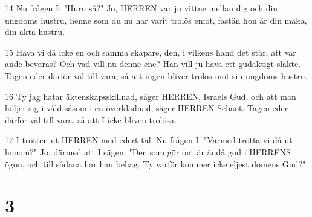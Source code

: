 \par 14 Nu frågen I: "Huru så?" Jo, HERREN var ju vittne mellan dig och din ungdoms hustru, henne som du nu har varit trolös emot, fastän hon är din maka, din äkta hustru.
\par 15 Hava vi då icke en och samma skapare, den, i vilkens hand det står, att vår ande bevaras? Och vad vill nu denne ene? Han vill ju hava ett gudaktigt släkte. Tagen eder därför väl till vara, så att ingen bliver trolös mot sin ungdoms hustru.
\par 16 Ty jag hatar äktenskapsskillnad, säger HERREN, Israels Gud, och att man höljer sig i våld såsom i en överklädnad, säger HERREN Sebaot. Tagen eder därför väl till vara, så att I icke bliven trolösa.
\par 17 I trötten ut HERREN med edert tal. Nu frågen I: "Varmed trötta vi då ut honom?" Jo, därmed att I sägen: "Den som gör ont är ändå god i HERRENS ögon, och till sådana har han behag. Ty varför kommer icke eljest domens Gud?"

\chapter{3}

